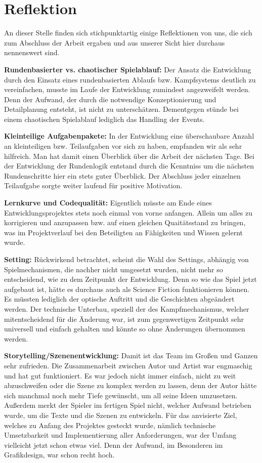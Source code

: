 
\section{Reflektion}

An dieser Stelle finden sich stichpunktartig einige Reflektionen von uns, die sich zum Abschluss der Arbeit ergaben und aus unserer Sicht hier durchaus nennenswert sind. 

    \textbf{Rundenbasierter vs. chaotischer Spielablauf:} Der Ansatz die Entwicklung durch den Einsatz eines rundenbasierten Ablaufs bzw. Kampfsystems deutlich zu vereinfachen, musste im Laufe der Entwicklung zumindest angezweifelt werden. Denn der Aufwand, der durch die notwendige Konzeptionierung und Detailplanung entsteht, ist nicht zu unterschätzen. Dementgegen stünde bei einem chaotischen Spielablauf lediglich das Handling der Events. 

    \textbf{Kleinteilige Aufgabenpakete:} In der Entwicklung eine überschaubare Anzahl an kleinteiligen bzw. Teilaufgaben vor sich zu haben, empfanden wir als sehr hilfreich. Man hat damit einen Überblick über die Arbeit der nächsten Tage. Bei der Entwicklung der Rundenlogik entstand durch die Kenntniss um die nächsten Rundenschritte hier ein stets guter Überblick. Der Abschluss jeder einzelnen Teilaufgabe sorgte weiter laufend für positive Motivation.

    \textbf{Lernkurve und Codequalität:} Eigentlich müsste am Ende eines Entwicklungsprojektes stets noch einmal von vorne anfangen. Allein um alles zu korrigieren und anzupassen bzw. auf einen gleichen Quaitätsstand zu bringen, was im Projektverlauf bei den Beteiligten an Fähigkeiten und Wissen gelernt wurde.

    \textbf{Setting:} Rückwirkend betrachtet, scheint die Wahl des Settings, abhängig von Spielmechanismen, die nachher nicht umgesetzt wurden, nicht mehr so entscheidend, wie zu dem Zeitpunkt der Entwicklung. Denn so wie das Spiel jetzt aufgebaut ist, hätte es durchaus auch als Science Fiction funktionieren können. Es müssten lediglich der optische Auftritt und die Geschichten abgeändert werden. Der technische Unterbau, speziell der des Kampfmechanismus, welcher mitentscheidend für die Änderung war, ist zum gegenwertigen Zeitpunkt sehr universell und einfach gehalten und könnte so ohne Änderungen übernommen werden.

    \textbf{Storytelling/Szenenentwicklung:} Damit ist das Team im Großen und Ganzen sehr zufrieden. Die Zusammenarbeit zwischen Autor und Artist war engmaschig und hat gut funktioniert. Es war jedoch nicht immer einfach, nicht zu weit abzuschweifen oder die Szene zu komplex werden zu lassen, denn der Autor hätte sich manchmal noch mehr Tiefe gewünscht, um all seine Ideen umzusetzen. Außerdem merkt der Spieler im fertigen Spiel nicht, welcher Aufwand betrieben wurde, um die Texte und die Szenen zu entwickeln. Für das anvisierte Ziel, welches zu Anfang des Projektes gesteckt wurde, nämlich technische Umsetzbarkeit und Implementierung aller Anforderungen, war der Umfang vielleicht jetzt schon etwas viel. Denn der Aufwand, im Besonderen im Grafikdesign, war schon recht hoch.

